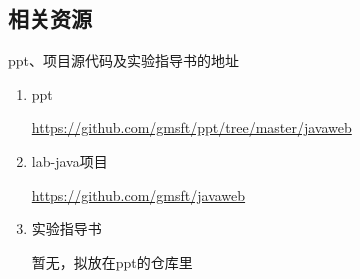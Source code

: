 \documentclass{beamer}
\begin{document}
\subsection{相关资源}
\begin{frame}
\begin{block}{ppt、项目源代码及实验指导书的地址}
\begin{enumerate}
\item
ppt

\url{https://github.com/gmsft/ppt/tree/master/javaweb}
\item
lab-java项目

\url{https://github.com/gmsft/javaweb}

\item
实验指导书

暂无，拟放在ppt的仓库里
\end{enumerate}
\end{block}
\end{frame}



\end{document}
